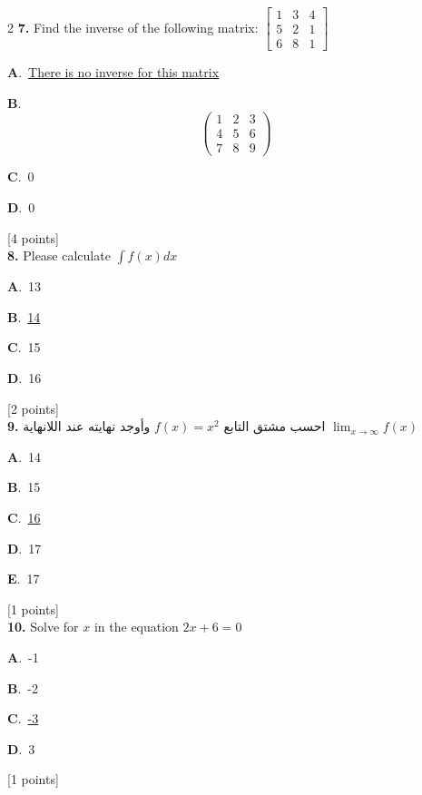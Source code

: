 \documentclass[12pt]{article}
\newcommand{\choice}[3]{%
  \noindent\textbf{#1}.~#2\hfill#3\par\vspace{0.25em}
}
\begin{document}
\begin{multicols}{2}
\noindent \textbf{\textenglish{7.}} {\textenglish{Find the inverse of the following matrix: }}\(\begin{bmatrix} 1 & 3 & 4 \\ 5 & 2 & 1 \\ 6 & 8 & 1 \end{bmatrix}\)

\noindent\choice{A}{\underline{{\textenglish{There is no inverse for this matrix}}}}{}
\noindent\choice{B}{\[\begin{pmatrix} 1 & 2 & 3 \\ 4 & 5 & 6 \\ 7 & 8 & 9  \end{pmatrix}\]}{}
\noindent\choice{C}{{\textenglish{0}}}{}
\noindent\choice{D}{{\textenglish{0}}}{}
\hfill {\textenglish{[4 points]}}\\[0.5em]

\noindent \textbf{\textenglish{8.}} {\textenglish{Please calculate }}\(\int f(x)dx\)

\noindent\choice{A}{{\textenglish{13}}}{}
\noindent\choice{B}{\underline{{\textenglish{14}}}}{}
\noindent\choice{C}{{\textenglish{15}}}{}
\noindent\choice{D}{{\textenglish{16}}}{}
\hfill {\textenglish{[2 points]}}\\[0.5em]

\noindent \textbf{\textenglish{9.}} {\textarabic{احسب مشتق التابع }}\( f(x) = x^2\){\textarabic{ وأوجد نهايته عند اللانهاية }}\(\lim_{x \to \infty}f(x)\)

\noindent\choice{A}{{\textenglish{14}}}{}
\noindent\choice{B}{{\textenglish{15}}}{}
\noindent\choice{C}{\underline{{\textenglish{16}}}}{}
\noindent\choice{D}{{\textenglish{17}}}{}
\noindent\choice{E}{{\textenglish{17}}}{}
\hfill {\textenglish{[1 points]}}\\[0.5em]

\noindent \textbf{\textenglish{10.}} {\textenglish{Solve for }}\(x \){\textenglish{ in the equation }}\(2x+6 = 0 \)

\noindent\choice{A}{{\textenglish{-1}}}{}
\noindent\choice{B}{{\textenglish{-2}}}{}
\noindent\choice{C}{\underline{{\textenglish{-3}}}}{}
\noindent\choice{D}{{\textenglish{3}}}{}
\hfill {\textenglish{[1 points]}}\\[0.5em]


\end{multicols}
\end{document}
